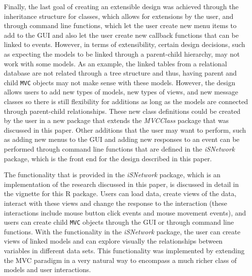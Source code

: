 \documentclass[11pt]{article}
\newcommand{\Robject}[1]{{\texttt{#1}}}
\newcommand{\Rpackage}[1]{{\textit{#1}}}
\begin{document}
Finally, the last goal of creating an extensible design was achieved through
the inheritance structure for classes, which allows for extensions by the
user, and through command line functions, which let the user create new menu
items to add to the GUI and also let the user create new callback functions
that can be linked to events.  However, in terms of extensibility, certain
design decisions, such as expecting the models to be linked through a
parent-child hierarchy, may not work with some models.  As an example, the
linked tables from a relational database are not related through a tree
structure and thus, having parent and child \Robject{MVC} objects may not make
sense with these models.  However, the design allows users to add new types
of models, new types of views, and new message classes so there is still
flexibility for additions as long as the models are connected through
parent-child relationships.  These new class definitions could be created by
the user in a new package that extends the \Rpackage{MVCClass} package that
was discussed in this paper.  Other additions that the user may want to
perform, such as adding new menus to the GUI and adding new responses to an
event can be performed through command line functions that are defined in the
\Rpackage{iSNetwork} package, which is the front end for the design
described in this paper. 

The functionality that is provided in the \Rpackage{iSNetwork} package, which
is an implementation of the research discussed in this paper, is
discussed in detail in the vignette for this R package.  Users can load data,
create views of the data, interact with these views and change the response to
the interaction (these interactions include mouse button click events and
mouse movement events), and users can create child \Robject{MVC} objects
through the GUI or through command line functions.  With the functionality in
the \Rpackage{iSNetwork} package, the user can create views of linked models
and can explore visually the relationships between variables in different data
sets.  This functionality was implemented by extending the MVC paradigm in a
very natural way to encompass a much richer class of models and user
interactions. 



\end{document}
